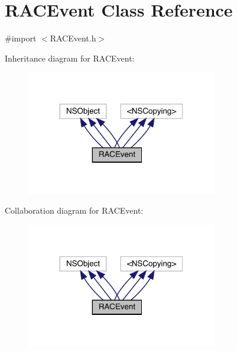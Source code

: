 \hypertarget{interface_r_a_c_event}{}\section{R\+A\+C\+Event Class Reference}
\label{interface_r_a_c_event}


{\ttfamily \#import $<$R\+A\+C\+Event.\+h$>$}



Inheritance diagram for R\+A\+C\+Event\+:\nopagebreak
\begin{figure}[H]
\begin{center}
\leavevmode
\includegraphics[width=236pt]{interface_r_a_c_event__inherit__graph}
\end{center}
\end{figure}


Collaboration diagram for R\+A\+C\+Event\+:\nopagebreak
\begin{figure}[H]
\begin{center}
\leavevmode
\includegraphics[width=236pt]{interface_r_a_c_event__coll__graph}
\end{center}
\end{figure}
